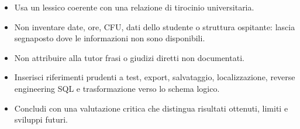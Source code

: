 \begin{itemize}
    \item Usa un lessico coerente con una relazione di tirocinio universitaria.
    \item Non inventare date, ore, CFU, dati dello studente o struttura ospitante: lascia segnaposto dove le informazioni non sono disponibili.
    \item Non attribuire alla tutor frasi o giudizi diretti non documentati.
    \item Inserisci riferimenti prudenti a test, export, salvataggio, localizzazione, reverse engineering SQL e trasformazione verso lo schema logico.
    \item Concludi con una valutazione critica che distingua risultati ottenuti, limiti e sviluppi futuri.
\end{itemize}
